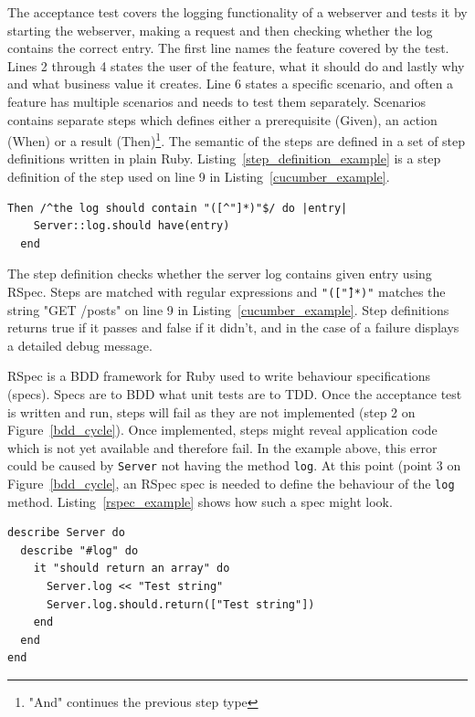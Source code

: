 The acceptance test covers the logging functionality of a webserver and tests it
by starting the webserver, making a request and then checking whether the log
contains the correct entry.  The first line names the feature covered by the
test. Lines 2 through 4 states the user of the feature, what it should do and
lastly why and what business value it creates. Line 6 states a specific
scenario, and often a feature has multiple scenarios and needs to test them
separately. Scenarios contains separate steps which defines either a
prerequisite (Given), an action (When) or a result (Then)\footnote{"And"
continues the previous step type}. The semantic of the steps are defined in a
set of step definitions written in plain Ruby.
Listing~\ref{step_definition_example} is a step definition of the step used on
line 9 in Listing~\ref{cucumber_example}.

\bigskip
\begin{lstlisting}[label=step_definition_example,caption=Cucumber step definition]
  Then /^the log should contain "([^"]*)"$/ do |entry|
    Server::log.should have(entry)
  end
\end{lstlisting}

The step definition checks whether the server log contains given entry using
RSpec. Steps are matched with regular expressions and \texttt{"([\^"]*)"}
matches the string "GET /posts" on line 9 in Listing~\ref{cucumber_example}.
Step definitions returns true if it passes and false if it didn't, and in the
case of a failure displays a detailed debug message.

RSpec is a BDD framework for Ruby used to write behaviour specifications
(specs). Specs are to BDD what unit tests are to TDD\@. Once the acceptance test is
written and run, steps will fail as they are not implemented (step 2 on
Figure~\ref{bdd_cycle}). Once implemented, steps might reveal application code
which is not yet available and therefore fail. In the example above, this error
could be caused by \texttt{Server} not having the method \texttt{log}. At this
point (point 3 on Figure~\ref{bdd_cycle}, an RSpec spec is needed to define the
behaviour of the \texttt{log} method. Listing~\ref{rspec_example} shows how such
a spec might look.

\newpage
\begin{lstlisting}[label=rspec_example,caption=RSpec (spec) example]
describe Server do
  describe "#log" do
    it "should return an array" do
      Server.log << "Test string"
      Server.log.should.return(["Test string"])
    end
  end
end
\end{lstlisting}

